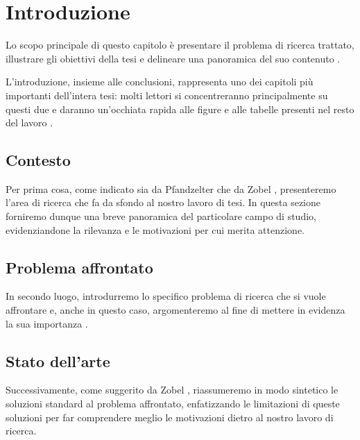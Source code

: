 \chapter{Introduzione} 
\label{chap:introduzione}

\acresetall

Lo scopo principale di questo capitolo è presentare il problema di ricerca trattato, illustrare gli obiettivi della tesi e delineare una panoramica del suo contenuto \cite{pfandzelter2022thesis}.

\medskip

L'introduzione, insieme alle conclusioni, rappresenta uno dei capitoli più importanti dell'intera tesi: molti lettori si concentreranno principalmente su questi due e daranno un'occhiata rapida alle figure e alle tabelle presenti nel resto del lavoro \cite{tuni2019guide}.

\section{Contesto}

Per prima cosa, come indicato sia da Pfandzelter \etAl \cite{pfandzelter2022thesis} che da Zobel \cite{zobel2015writing}, presenteremo l'area di ricerca che fa da sfondo al nostro lavoro di tesi. In questa sezione forniremo dunque una breve panoramica del particolare campo di studio, evidenziandone la rilevanza e le motivazioni per cui merita attenzione.

\section{Problema affrontato}

In secondo luogo, introdurremo lo specifico problema di ricerca che si vuole affrontare e, anche in questo caso, argomenteremo al fine di mettere in evidenza la sua importanza \cite{zobel2015writing}.

\section{Stato dell'arte}

Successivamente, come suggerito da Zobel \cite{zobel2015writing}, riassumeremo in modo sintetico le soluzioni standard al problema affrontato, enfatizzando le limitazioni di queste soluzioni per far comprendere meglio le motivazioni dietro al nostro lavoro di ricerca.

